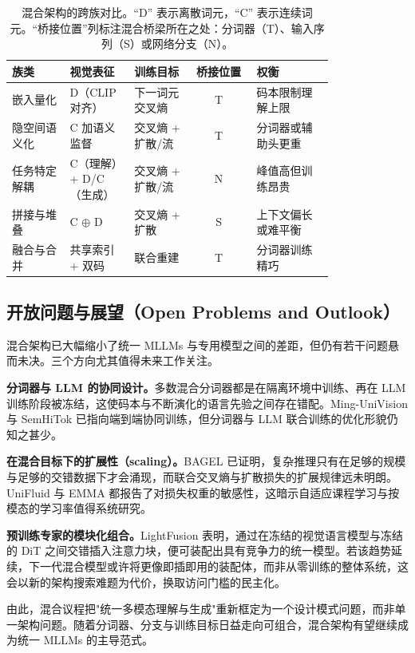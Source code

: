 \begin{table}[t]
  \caption{混合架构的跨族对比。``D'' 表示离散词元，``C'' 表示连续词元。``桥接位置''列标注混合桥梁所在之处：分词器（T）、输入序列（S）或网络分支（N）。}
  \label{tab:hybrid-compare}
  \small
  \setlength{\tabcolsep}{4pt}
  \begin{tabular}{@{}p{0.18\linewidth}p{0.20\linewidth}p{0.18\linewidth}cp{0.24\linewidth}@{}}
    \toprule
    族类 & 视觉表征 & 训练目标 & 桥接位置 & 权衡 \\
    \midrule
    嵌入量化                       & D（CLIP 对齐）            & 下一词元交叉熵        & T & 码本限制理解上限 \\
    隐空间语义化                   & C 加语义监督              & 交叉熵 + 扩散/流      & T & 分词器或辅助头更重 \\
    任务特定解耦                   & C（理解）+ D/C（生成）   & 交叉熵 + 扩散/流      & N & 峰值高但训练昂贵 \\
    拼接与堆叠                     & C $\oplus$ D              & 交叉熵 + 扩散          & S & 上下文偏长或难平衡 \\
    融合与合并                     & 共享索引 + 双码          & 联合重建               & T & 分词器训练精巧 \\
    \bottomrule
  \end{tabular}
\end{table}

\subsection{开放问题与展望（Open Problems and Outlook）}
\label{subsec:hybrid-outlook}

混合架构已大幅缩小了统一 MLLMs 与专用模型之间的差距，但仍有若干问题悬而未决。三个方向尤其值得未来工作关注。

\textbf{分词器与 LLM 的协同设计。}多数混合分词器都是在隔离环境中训练、再在 LLM 训练阶段被冻结，这使码本与不断演化的语言先验之间存在错配。Ming-UniVision 与 SemHiTok 已指向端到端协同训练，但分词器与 LLM 联合训练的优化形貌仍知之甚少。

\textbf{在混合目标下的扩展性（scaling）。}BAGEL 已证明，复杂推理只有在足够的规模与足够的交错数据下才会涌现，而联合交叉熵与扩散损失的扩展规律远未明朗。UniFluid 与 EMMA 都报告了对损失权重的敏感性，这暗示自适应课程学习与按模态的学习率值得系统研究。

\textbf{预训练专家的模块化组合。}LightFusion 表明，通过在冻结的视觉语言模型与冻结的 DiT 之间交错插入注意力块，便可装配出具有竞争力的统一模型。若该趋势延续，下一代混合模型或许将更像即插即用的装配体，而非从零训练的整体系统，这会以新的架构搜索难题为代价，换取访问门槛的民主化。

由此，混合议程把"统一多模态理解与生成"重新框定为一个设计模式问题，而非单一架构问题。随着分词器、分支与训练目标日益走向可组合，混合架构有望继续成为统一 MLLMs 的主导范式。

